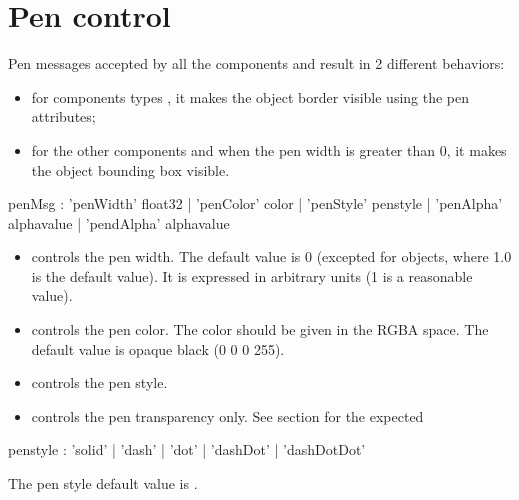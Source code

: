 \documentclass[a4paper,twoside]{report}
\newcommand{\sublevel}[1]	{\section{#1}}
\begin{document}
\sublevel{Pen control}
\label{pencontrol}

Pen messages accepted by all the components and result in 2 different behaviors:
\begin{itemize}
\item for components types , it makes the object border visible using the pen attributes;
\item for the other components and when the pen width is greater than 0, it makes the object bounding box visible.
\end{itemize}


\begin{rail}
penMsg : 	  'penWidth' float32
			| 'penColor' color 
			| 'penStyle' penstyle
			| 'penAlpha' alphavalue
			| 'pendAlpha' alphavalue
\end{rail}

\begin{itemize}
\item {} controls the pen width. The default value is 0 (excepted for  objects, where 1.0 is the default value). It is expressed in arbitrary units (1 is a reasonable value).
\item {} controls the pen color. The color should be given in the RGBA space. The default value is opaque black (0 0 0 255).
\item {} controls the pen style.
\item {} controls the pen transparency only. See section  for the expected 
 \end{itemize}


\begin{rail}
penstyle : 'solid' | 'dash' | 'dot' | 'dashDot' | 'dashDotDot'
\end{rail}

The pen style default value is .\\
\end{document}
